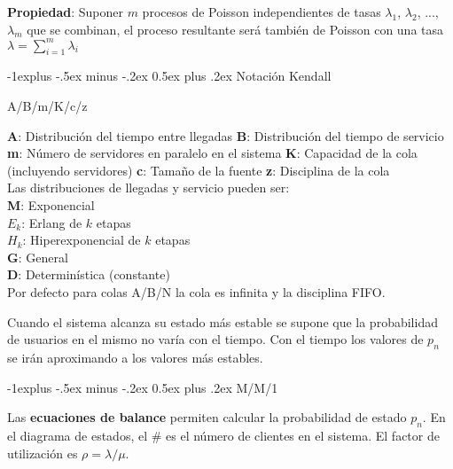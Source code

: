 \documentclass[9pt,landscape]{article}
\makeatletter
\renewcommand{\subsection}{\@startsection{subsection}{2}{0mm}%
                                {-1explus -.5ex minus -.2ex}%
                                {0.5ex plus .2ex}%
                                {\normalfont\normalsize\bfseries}}
\makeatother
\begin{document}
\begin{multicols}{3}
\textbf{Propiedad}: Suponer $m$ procesos de Poisson independientes de tasas $\lambda_{1}$, $\lambda_{2}$, ..., $\lambda_{m}$ que se combinan, el proceso resultante será también de Poisson con una tasa $\lambda = \sum_{i = 1}^{m} \lambda_{i}$
	
\subsection{Notación Kendall}
	
	\begin{center}
		\large{A/B/m/K/c/z}
	\end{center}
	
	\quad \textbf{A}: Distribución del tiempo entre llegadas
	\quad \textbf{B}: Distribución del tiempo de servicio
	\quad \textbf{m}: Número de servidores en paralelo en el sistema
	\quad \textbf{K}: Capacidad de la cola (incluyendo servidores)
	\quad \textbf{c}: Tamaño de la fuente
	\quad \textbf{z}: Disciplina de la cola\\

Las distribuciones de llegadas y servicio pueden ser:\\

	\quad \textbf{M}: Exponencial\\
	\quad \textbf{$E_{k}$}: Erlang de $k$ etapas\\
	\quad \textbf{$H_{k}$}: Hiperexponencial de $k$ etapas\\
	\quad \textbf{G}: General\\
	\quad \textbf{D}: Determinística (constante)\\
	
Por defecto para colas A/B/N la cola es infinita y la disciplina FIFO.

Cuando el sistema alcanza su estado más estable se supone que la probabilidad de usuarios en el mismo no varía con el tiempo. Con el tiempo los valores de $p_{n}$ se irán aproximando a los valores más estables.

\subsection{M/M/1}

Las \textbf{ecuaciones de balance} permiten calcular la probabilidad de estado $p_{n}$. En el diagrama de estados, el $\#$ es el número de clientes en el sistema. El factor de utilización es $\rho = \lambda / \mu$.

\begin{center}
\begin{tikzpicture}[node distance = 1.5cm,scale=0.3, every node/.style={scale = 0.8}]


\end{tikzpicture}
\end{center}
\end{multicols}
\end{document}
